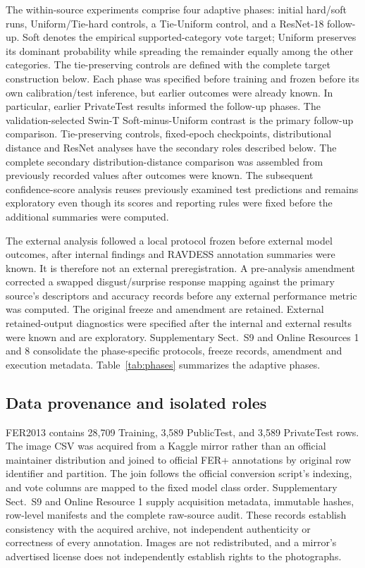 \documentclass[pdflatex,sn-mathphys-num]{sn-jnl}
\begin{document}
The within-source experiments comprise four adaptive phases: initial hard/soft runs, Uniform/Tie-hard controls, a Tie-Uniform control, and a ResNet-18 follow-up. Soft denotes the empirical supported-category vote target; Uniform preserves its dominant probability while spreading the remainder equally among the other categories. The tie-preserving controls are defined with the complete target construction below. Each phase was specified before training and frozen before its own calibration/test inference, but earlier outcomes were already known. In particular, earlier PrivateTest results informed the follow-up phases. The validation-selected Swin-T Soft-minus-Uniform contrast is the primary follow-up comparison. Tie-preserving controls, fixed-epoch checkpoints, distributional distance and ResNet analyses have the secondary roles described below. The complete secondary distribution-distance comparison was assembled from previously recorded values after outcomes were known. The subsequent confidence-score analysis reuses previously examined test predictions and remains exploratory even though its scores and reporting rules were fixed before the additional summaries were computed.

The external analysis followed a local protocol frozen before external model outcomes, after internal findings and RAVDESS annotation summaries were known. It is therefore not an external preregistration. A pre-analysis amendment corrected a swapped disgust/surprise response mapping against the primary source's descriptors and accuracy records before any external performance metric was computed. The original freeze and amendment are retained. External retained-output diagnostics were specified after the internal and external results were known and are exploratory. Supplementary Sect.~S9 and Online Resources 1 and 8 consolidate the phase-specific protocols, freeze records, amendment and execution metadata. Table~\ref{tab:phases} summarizes the adaptive phases.


\subsection{Data provenance and isolated roles}
FER2013 contains 28,709 Training, 3,589 PublicTest, and 3,589 PrivateTest rows. The image CSV was acquired from a Kaggle mirror rather than an official maintainer distribution and joined to official FER+ annotations by original row identifier and partition. The join follows the official conversion script's indexing, and vote columns are mapped to the fixed model class order. Supplementary Sect.~S9 and Online Resource 1 supply acquisition metadata, immutable hashes, row-level manifests and the complete raw-source audit. These records establish consistency with the acquired archive, not independent authenticity or correctness of every annotation. Images are not redistributed, and a mirror's advertised license does not independently establish rights to the photographs.
\end{document}
